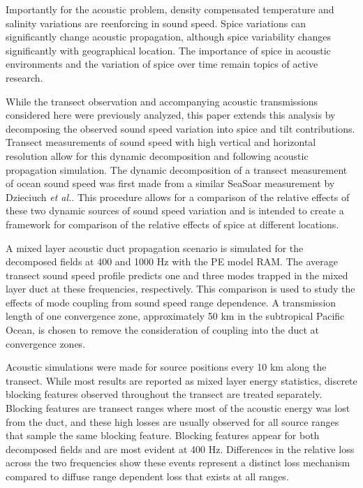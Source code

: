 \documentclass[preprint,NumberedRefs]{JASA}
\begin{document}
Importantly for the acoustic problem, density compensated temperature and salinity variations are reenforcing in sound speed. Spice variations can significantly change acoustic propagation, although spice variability changes significantly with geographical location\citep{colosi12,colosi13,murat2021}. The importance of spice in acoustic environments and the variation of spice over time remain topics of active research.

While the transect observation and accompanying acoustic transmissions considered here were previously analyzed\citep{colosi2020observations}, this paper extends this analysis by decomposing the observed sound speed variation into spice and tilt contributions. Transect measurements of sound speed with high vertical and horizontal resolution allow for this dynamic decomposition and following acoustic propagation simulation. The dynamic decomposition of a transect measurement of ocean sound speed was first made from a similar SeaSoar measurement by Dzieciuch \emph{et al.}\citep{dzieciuch2004}. This procedure allows for a comparison of the relative effects of these two dynamic sources of sound speed variation and is intended to create a framework for comparison of the relative effects of spice at different locations.

A mixed layer acoustic duct propagation scenario is simulated for the decomposed fields at 400 and 1000 Hz with the PE model RAM\cite{collins93}. The average transect sound speed profile predicts one and three modes trapped in the mixed layer duct at these frequencies, respectively. This comparison is used to study the effects of mode coupling from sound speed range dependence. A transmission length of one convergence zone\citep{jensen2011computational}, approximately 50 km in the subtropical Pacific Ocean, is chosen to remove the consideration of coupling into the duct at convergence zones\citep{colosi2020observations}.

Acoustic simulations were made for source positions every 10 km along the transect. While most results are reported as mixed layer energy statistics, discrete blocking features\citep{colosi2020observations} observed throughout the transect are treated separately. Blocking features are transect ranges where most of the acoustic energy was lost from the duct, and these high losses are usually observed for all source ranges that sample the same blocking feature. Blocking features appear for both decomposed fields and are most evident at 400 Hz. Differences in the relative loss across the two frequencies show these events represent a distinct loss mechanism compared to diffuse range dependent loss that exists at all ranges.
\end{document}
